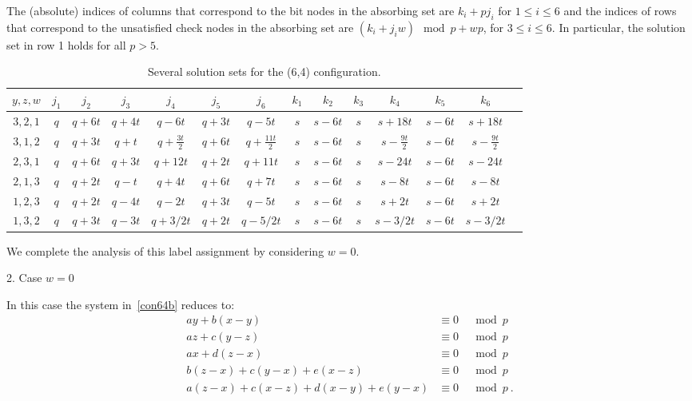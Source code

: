 {The (absolute) indices of columns that correspond to the bit nodes
in the absorbing set are $k_i+pj_i$ for $1 \leq i \leq 6$ and the
indices of rows that correspond to the unsatisfied check nodes in
the absorbing set are $(k_i+j_iw) \mod p+ wp$, for $3\leq i \leq 6$.
In particular, the solution set in row 1 holds for all $p > 5$.

\hspace{-0.95in}\small{\hspace{-0.95in}\begin{table}[ht]\vspace{-0.05in}\hspace{-0.95in}
\begin{tabular}{|c |c|c|c|c|c|c|c|c|c|c|c|c|c|}
  \hline
  $y,z,w$ & $j_1$ & $j_2$ & $j_3$ & $j_4$ & $j_5$ & $j_6$ & $k_1$ & $k_2$ & $k_3$ & $k_4$ & $k_5$ & $k_6$ \\
  \hline
$3,2,1$&  $q$ & $q+6t$ &  $q+4t$ &  $q-6t$ &  $q+3t$ & $q-5t$ & $s$
& $s-6t$ & $s$ & $s+18t$ & $s-6t$ &
  $s+18t$\\
  $3,1,2$&$q$& $q+3t$ &  $q+t$ &    $q+\frac{3t}{2}$ &  $q+6t$ &   $q+\frac{11t}{2}$ & $s$ & $s-6t$ & $s$ & $s-\frac{9t}{2}$ & $s-6t$ &
  $s-\frac{9t}{2}$\\
 $2,3,1$& $q$ & $q+6t$ &  $q+3t$&    $q+12t$ &  $q+2t$ &   $q+11t$ & $s$ & $s-6t$ & $s$ & $s-24t$ & $s-6t$ &
  $s-24t$\\
$2,1,3$&  $q$ & $q+2t$ &  $q-t$ &  $q+4t$ &   $q+6t$ &    $q+7t$ &
$s$ & $s-6t$ & $s$ & $s-8t$ & $s-6t$ &
  $s-8t$\\
 $1,2,3$& $q$ & $q+2t$ &  $q-4t$ &    $q-2t$ &    $q+3t$ &    $q-5t$ & $s$ & $s-6t$ & $s$ & $s+2t$ & $s-6t$ &
  $s+2t$\\
  $1,3,2$&$q$ & $q+3t$ &  $q-3t$ &    $q+3/2t$ &  $q+2t$ &   $q-5/2t$ & $s$ & $s-6t$ & $s$ & $s-3/2t$ & $s-6t$ &
  $s-3/2t$\\
  \hline
\end{tabular}
\caption{ Several solution sets for the (6,4)
configuration.}\label{table64}
\end{table}}
\normalsize }

We complete the analysis of this label assignment by considering
$w=0$.

2. Case $w=0$



In this case the system in~\eqref{con64b} reduces to:
 \begin{equation}\label{sys31a}\begin{array}{ccccc}
 ay+b(x-y) &\equiv 0 &\mod p\\
 az+c(y-z)  &\equiv 0 &\mod p\\
 ax+d(z-x) &\equiv 0 &\mod p\\
 b(z-x)+c(y-x)+e(x-z) &\equiv 0 &\mod p\\
 a(z-x)+c(x-z)+d(x-y)+e(y-x) &\equiv 0 &\mod p~.
 \end{array}
 \end{equation}


